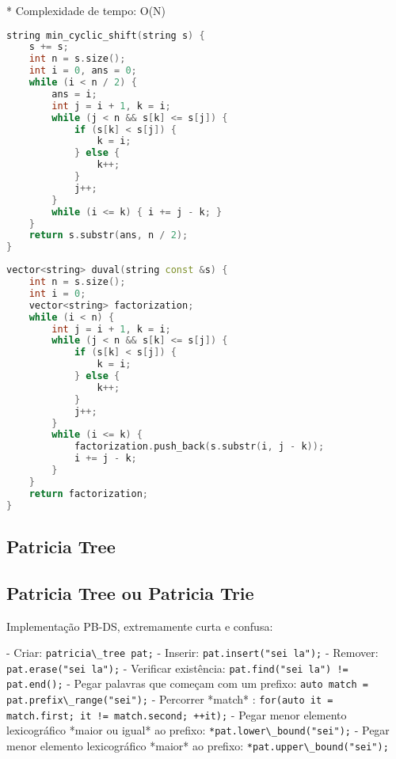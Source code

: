 \documentclass[11pt, a4paper, twoside]{article}
\begin{document}
* Complexidade de tempo: O(N)


\begin{multicols}{2}
\begin{lstlisting}[language=C++]
string min_cyclic_shift(string s) {
    s += s;
    int n = s.size();
    int i = 0, ans = 0;
    while (i < n / 2) {
        ans = i;
        int j = i + 1, k = i;
        while (j < n && s[k] <= s[j]) {
            if (s[k] < s[j]) {
                k = i;
            } else {
                k++;
            }
            j++;
        }
        while (i <= k) { i += j - k; }
    }
    return s.substr(ans, n / 2);
}
\end{lstlisting}
\end{multicols}

\begin{lstlisting}[language=C++]
vector<string> duval(string const &s) {
    int n = s.size();
    int i = 0;
    vector<string> factorization;
    while (i < n) {
        int j = i + 1, k = i;
        while (j < n && s[k] <= s[j]) {
            if (s[k] < s[j]) {
                k = i;
            } else {
                k++;
            }
            j++;
        }
        while (i <= k) {
            factorization.push_back(s.substr(i, j - k));
            i += j - k;
        }
    }
    return factorization;
}
\end{lstlisting}

\subsection{Patricia Tree}

\subsection{Patricia Tree ou Patricia Trie}

Implementação PB-DS, extremamente curta e confusa:

- Criar: \lstinline{patricia\_tree pat;}
- Inserir: \lstinline{pat.insert("sei la");}
- Remover: \lstinline{pat.erase("sei la");}
- Verificar existência: \lstinline{pat.find("sei la") != pat.end();}
- Pegar palavras que começam com um prefixo: \lstinline{auto match = pat.prefix\_range("sei");}
- Percorrer *match* : \lstinline{for(auto it = match.first; it != match.second; ++it);}
- Pegar menor elemento lexicográfico *maior ou igual* ao prefixo: \lstinline{*pat.lower\_bound("sei");} 
- Pegar menor elemento lexicográfico *maior* ao prefixo: \lstinline{*pat.upper\_bound("sei");} 
\end{document}
